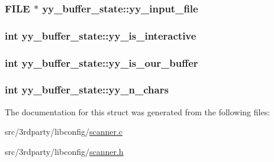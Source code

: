 \hypertarget{structyy__buffer__state_a4360acfb226a1fc240ab2be17dd6beda}{
\subsubsection[{yy\-\_\-input\-\_\-file}]{\setlength{\rightskip}{0pt plus 5cm}F\-I\-L\-E $\ast$ yy\-\_\-buffer\-\_\-state\-::yy\-\_\-input\-\_\-file}}\label{structyy__buffer__state_a4360acfb226a1fc240ab2be17dd6beda}
\hypertarget{structyy__buffer__state_abf5c70eea75581b58c0ee7bd31b14490}{
\subsubsection[{yy\-\_\-is\-\_\-interactive}]{\setlength{\rightskip}{0pt plus 5cm}int yy\-\_\-buffer\-\_\-state\-::yy\-\_\-is\-\_\-interactive}}\label{structyy__buffer__state_abf5c70eea75581b58c0ee7bd31b14490}
\hypertarget{structyy__buffer__state_a80ce2431c70dc4f89ced487f18449465}{
\subsubsection[{yy\-\_\-is\-\_\-our\-\_\-buffer}]{\setlength{\rightskip}{0pt plus 5cm}int yy\-\_\-buffer\-\_\-state\-::yy\-\_\-is\-\_\-our\-\_\-buffer}}\label{structyy__buffer__state_a80ce2431c70dc4f89ced487f18449465}
\hypertarget{structyy__buffer__state_a06406208824817acfec2183b79080945}{
\subsubsection[{yy\-\_\-n\-\_\-chars}]{\setlength{\rightskip}{0pt plus 5cm}int yy\-\_\-buffer\-\_\-state\-::yy\-\_\-n\-\_\-chars}}\label{structyy__buffer__state_a06406208824817acfec2183b79080945}


The documentation for this struct was generated from the following files\-:\begin{DoxyCompactItemize}
\item 
src/3rdparty/libconfig/\hyperlink{scanner_8c}{scanner.\-c}\item 
src/3rdparty/libconfig/\hyperlink{scanner_8h}{scanner.\-h}\end{DoxyCompactItemize}
